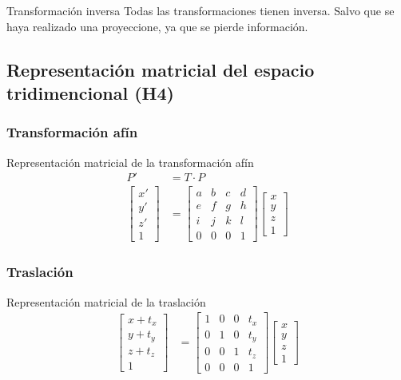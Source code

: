 \documentclass[a4paper, twoside]{article}
\begin{document}
\begin{definicion*}{Transformación inversa}
	Todas las transformaciones tienen inversa.
	Salvo que se haya realizado una proyeccione, ya que se pierde información.
\end{definicion*}

\subsection{Representación matricial del espacio tridimencional (H4)}

\subsubsection{Transformación afín}
\begin{definicion*}{Representación matricial de la transformación afín}
	\begin{align*}
		P' &= T \cdot P \\
		\begin{bmatrix}
			x' \\
			y' \\
			z' \\
			1
		\end{bmatrix} &=
		\begin{bmatrix}
			a & b & c & d \\
			e & f & g & h \\
			i & j & k & l \\
			0 & 0 & 0 & 1
		\end{bmatrix}
		\begin{bmatrix}
			x \\
			y \\
			z \\
			1
		\end{bmatrix}
	\end{align*}
\end{definicion*}

\subsubsection{Traslación}
\begin{definicion*}{Representación matricial de la traslación}
	\begin{align*}
		\begin{bmatrix}
			x + t_x \\
			y + t_y \\
			z + t_z \\
			1
		\end{bmatrix} &=
		\begin{bmatrix}
			1 & 0 & 0 & t_x \\
			0 & 1 & 0 & t_y \\
			0 & 0 & 1 & t_z \\
			0 & 0 & 0 & 1
		\end{bmatrix}
		\begin{bmatrix}
			x \\
			y \\
			z \\
			1
		\end{bmatrix}
	\end{align*}
\end{definicion*}
\end{document}
